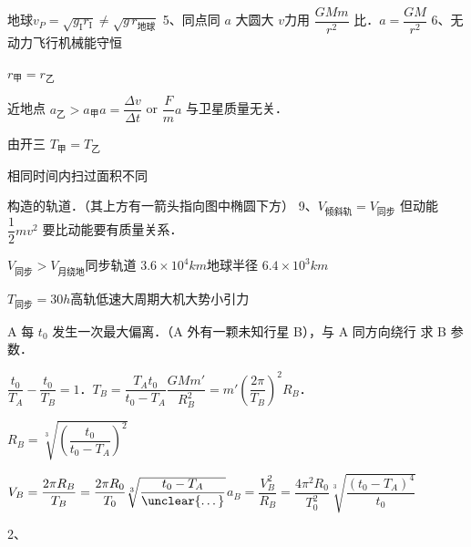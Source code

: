 
地球\quad $v_P=\sqrt{g_{\mathrm{I}}r_{\mathrm{I}}}\neq\sqrt{g\,r_{\text{地球}}}$%
5、同点同 $a$ 大圆大 $v$\quad 力用 $\dfrac{GMm}{r^2}$ 比．$a=\dfrac{GM}{r^2}$
6、无动力飞行机械能守恒%

$r_{\text{甲}}=r_{\text{乙}}$%

近地点 $a_{\text{乙}}>a_{\text{甲}}$\quad\quad $a=\dfrac{\Delta v}{\Delta t}$ or $\dfrac Fm$\quad $a$ 与卫星质量无关．

由开三 $T_{\text{甲}}=T_{\text{乙}}$

相同时间内扫过面积不同

构造的轨道．（其上方有一箭头指向图中椭圆下方）
9、$V_{\text{倾斜轨}}=V_{\text{同步}}$ 但动能 $\dfrac12mv^2$ 要比动能要有质量关系．%

$V_{\text{同步}}>V_{\text{月绕地}}$\quad 同步轨道 $3.6\times10^4\unit{km}$\quad 地球半径 $6.4\times10^3\unit{km}$

$T_{\text{同步}}=30\unit{h}$\quad 高轨低速大周期大机大势小引力%
\begin{problem}[11]
A 每 $t_0$ 发生一次最大偏离．（A 外有一颗未知行星 B），与 A 同方向绕行 求 B 参数．


\begin{solution}
$\dfrac{t_0}{T_A}-\dfrac{t_0}{T_B}=1$．\quad $T_B=\dfrac{T_At_0}{t_0-T_A}$\quad $\dfrac{GMm'}{R_B^{2}}=m'\left(\dfrac{2\pi}{T_B}\right)^{2}R_B$．

$R_B=\sqrt[3]{\left(\dfrac{t_0}{t_0-T_A}\right)^{2}}$%

$V_B=\dfrac{2\pi R_B}{T_B}=\dfrac{2\pi R_0}{T_0}\sqrt[3]{\dfrac{t_0-T_A}{\text{\unclear{…}}}}$\quad $a_B=\dfrac{V_B^{2}}{R_B}=\dfrac{4\pi^{2}R_0}{T_0^{2}}\sqrt[3]{\dfrac{(t_0-T_A)^{4}}{t_0}}$%
\end{solution}
\end{problem}
2、

